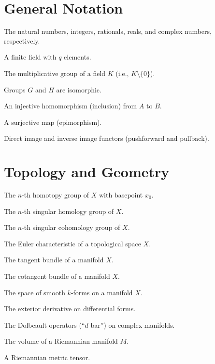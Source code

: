 \documentclass[12pt,a4paper]{book}
\theoremstyle{definition}
\theoremstyle{remark}
\let\origOmega\Omega
\def\Omega{\ensuremath{\origOmega}}
\let\origpi\pi
\def\pi{\ensuremath{\origpi}}
\let\origchi\chi
\def\chi{\ensuremath{\origchi}}
\begin{document}
\section*{General Notation}
\begin{description}[style=nextline, leftmargin=2cm]
\item[$\mathbb{N}, \mathbb{Z}, \mathbb{Q}, \mathbb{R}, \mathbb{C}$] The natural numbers, integers, rationals, reals, and complex numbers, respectively.
\item[$\mathbb{F}_q$] A finite field with $q$ elements.
\item[$K^{\times}$] The multiplicative group of a field $K$ (i.e., $K \setminus \{0\}$).
\item[$G \cong H$] Groups $G$ and $H$ are isomorphic.
\item[$A \hookrightarrow B$] An injective homomorphism (inclusion) from $A$ to $B$.
\item[$X \twoheadrightarrow Y$] A surjective map (epimorphism).
\item[$f^{\ast}, f_{\ast}$] Direct image and inverse image functors (pushforward and pullback).
\end{description}

\section*{Topology and Geometry}
\begin{description}[style=nextline, leftmargin=2cm]
\item[$\pi_n(X, x_0)$] The $n$-th homotopy group of $X$ with basepoint $x_0$.
\item[$H_n(X; \mathbb{Z})$] The $n$-th singular homology group of $X$.
\item[$H^n(X; \mathbb{Z})$] The $n$-th singular cohomology group of $X$.
\item[$\chi(X)$] The Euler characteristic of a topological space $X$.
\item[$TX$] The tangent bundle of a manifold $X$.
\item[$T^{\ast}X$] The cotangent bundle of a manifold $X$.
\item[$\Omega^k(X)$] The space of smooth $k$-forms on a manifold $X$.
\item[$d$] The exterior derivative on differential forms.
\item[$\partial, \bar{\partial}$] The Dolbeault operators (``$d$-bar'') on complex manifolds.
\item[$\text{vol}(M)$] The volume of a Riemannian manifold $M$.
\item[$g$] A Riemannian metric tensor.
\end{description}
\end{document}
